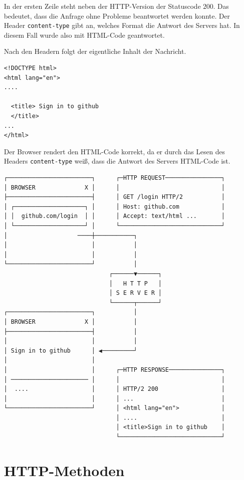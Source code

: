 \documentclass[a4paper]{scrartcl}
\begin{document}
In der ersten Zeile steht neben der HTTP-Version der Statuscode $200$.
Das bedeutet, dass die Anfrage ohne Probleme beantwortet werden konnte.
Der Header \texttt{content-type} gibt an, welches Format die Antwort des Servers hat.
In diesem Fall wurde also mit HTML-Code geantwortet.

Nach den Headern folgt der eigentliche Inhalt der Nachricht.

\begin{Verbatim}[label={verb:verbatim4}]
<!DOCTYPE html>
<html lang="en">
....

  <title> Sign in to github
  </title>
...
</html>
\end{Verbatim}
Der Browser rendert den HTML-Code korrekt, da er durch das Lesen des Headers \texttt{content-type} weiß, dass die Antwort des Servers HTML-Code ist.



\begin{Verbatim}[label={verb:verbatim5}]
┌────────────────────────┐      ┌─HTTP REQUEST────────────────┐
│ BROWSER              X │      │                             │
├────────────────────────┤      │ GET /login HTTP/2           │
│ ┌────────────────────┐ │      │ Host: github.com            │
│ │  github.com/login  │ │      │ Accept: text/html ...       │
│ └────────────────────┘ │      └─────────────────────────────┘
│                    ────┼───────────┐
│                        │           │
│                        │           │
└────────────────────────┘           │
                              ┌──────▼──────┐
                              │   H T T P   │
                              │ S E R V E R │
                              └──────┬──────┘
┌────────────────────────┐           │
│ BROWSER              X │           │
├────────────────────────┤           │
│                        │           │
│ Sign in to github      │ ◀─────────┘
│                        │
│                        │      ┌─HTTP RESPONSE───────────────┐
│ ────────────────────── │      │                             │
│  ....                  │      │ HTTP/2 200                  │
│                        │      │ ...                         │
└────────────────────────┘      │ <html lang="en">            │
                                │ ....                        │
                                │ <title>Sign in to github    │
                                └─────────────────────────────┘
\end{Verbatim}

\section{HTTP-Methoden}\label{sec:http-methoden}
\end{document}
